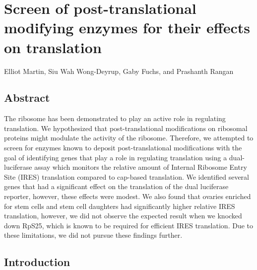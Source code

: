 \documentclass[12pt,oneside]{reedthesis}
\begin{document}









\hypertarget{screen-of-post-translational-modifying-enzymes-for-their-effects-on-translation}{%
\chapter{Screen of post-translational modifying enzymes for their effects on translation}\label{screen-of-post-translational-modifying-enzymes-for-their-effects-on-translation}}

Elliot Martin, Siu Wah Wong-Deyrup, Gaby Fuchs, and Prashanth Rangan

\setlength\parindent{24pt}

\hypertarget{abstract-1}{%
\section{Abstract}\label{abstract-1}}

The ribosome has been demonstrated to play an active role in regulating
translation. We hypothesized that post-translational modifications on
ribosomal proteins might modulate the activity of the ribosome.
Therefore, we attempted to screen for enzymes known to deposit
post-translational modifications with the goal of identifying genes that
play a role in regulating translation using a dual-luciferase assay
which monitors the relative amount of Internal Ribosome Entry Site
(IRES) translation compared to cap-based translation. We identified
several genes that had a significant effect on the translation of the
dual luciferase reporter, however, these effects were modest. We also
found that ovaries enriched for stem cells and stem cell daughters had
significantly higher relative IRES translation, however, we did not
observe the expected result when we knocked down RpS25, which is known
to be required for efficient IRES translation. Due to these limitations,
we did not pursue these findings further.

\hypertarget{introduction-3}{%
\section{Introduction}\label{introduction-3}}
\end{document}
